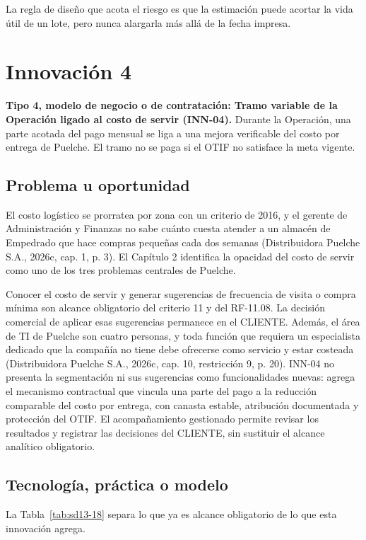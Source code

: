 La regla de diseño que acota el riesgo es que la estimación puede acortar la vida útil de un lote, pero nunca alargarla más allá de la fecha impresa.

\section{Innovación 4}

\textbf{Tipo 4, modelo de negocio o de contratación: Tramo variable de la Operación ligado al costo de servir (INN-04).} Durante la Operación, una parte acotada del pago mensual se liga a una mejora verificable del costo por entrega de Puelche. El tramo no se paga si el OTIF no satisface la meta vigente.

\subsection{Problema u oportunidad}

El costo logístico se prorratea por zona con un criterio de 2016, y el gerente de Administración y Finanzas no sabe cuánto cuesta atender a un almacén de Empedrado que hace compras pequeñas cada dos semanas (Distribuidora Puelche S.A., 2026c, cap. 1, p. 3). El Capítulo 2 identifica la opacidad del costo de servir como uno de los tres problemas centrales de Puelche.

Conocer el costo de servir y generar sugerencias de frecuencia de visita o compra mínima son alcance obligatorio del criterio 11 y del RF-11.08. La decisión comercial de aplicar esas sugerencias permanece en el CLIENTE. Además, el área de TI de Puelche son cuatro personas, y toda función que requiera un especialista dedicado que la compañía no tiene debe ofrecerse como servicio y estar costeada (Distribuidora Puelche S.A., 2026c, cap. 10, restricción 9, p. 20). INN-04 no presenta la segmentación ni sus sugerencias como funcionalidades nuevas: agrega el mecanismo contractual que vincula una parte del pago a la reducción comparable del costo por entrega, con canasta estable, atribución documentada y protección del OTIF. El acompañamiento gestionado permite revisar los resultados y registrar las decisiones del CLIENTE, sin sustituir el alcance analítico obligatorio.

\subsection{Tecnología, práctica o modelo}

La Tabla~\ref{tab:sd13-18} separa lo que ya es alcance obligatorio de lo que esta innovación agrega.

